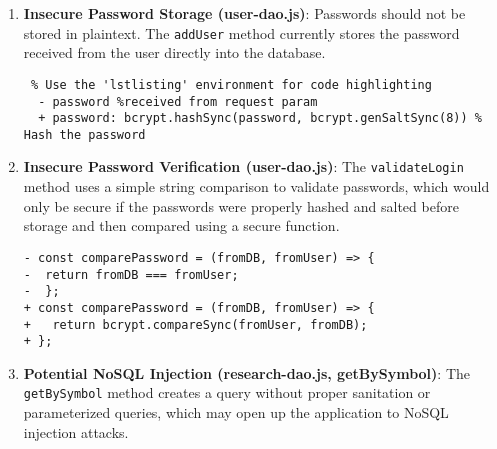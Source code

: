   \begin{enumerate}
  \def\labelenumi{\arabic{enumi}.}
  \item
    \textbf{Insecure Password Storage (user-dao.js)}: Passwords should not
    be stored in plaintext. The \texttt{addUser} method currently stores
    the password received from the user directly into the database.
  


  \begin{framed}
    \scriptsize
  \begin{verbatim} % Use the 'lstlisting' environment for code highlighting
  - password %received from request param
  + password: bcrypt.hashSync(password, bcrypt.genSaltSync(8)) % Hash the password
  \end{verbatim}
  \end{framed}

  \item
    \textbf{Insecure Password Verification (user-dao.js)}: The
    \texttt{validateLogin} method uses a simple string comparison to
    validate passwords, which would only be secure if the passwords were
    properly hashed and salted before storage and then compared using a
    secure function.
  
  \begin{framed}
    \scriptsize
  \begin{verbatim}
- const comparePassword = (fromDB, fromUser) => { 
-  return fromDB === fromUser; 
-  }; 
+ const comparePassword = (fromDB, fromUser) => { 
+   return bcrypt.compareSync(fromUser, fromDB); 
+ };
  \end{verbatim}
  \end{framed}
  \item
    \textbf{Potential NoSQL Injection (research-dao.js, getBySymbol)}: The
    \texttt{getBySymbol} method creates a query without proper sanitation
    or parameterized queries, which may open up the application to NoSQL
    injection attacks.
  

\end{enumerate}
